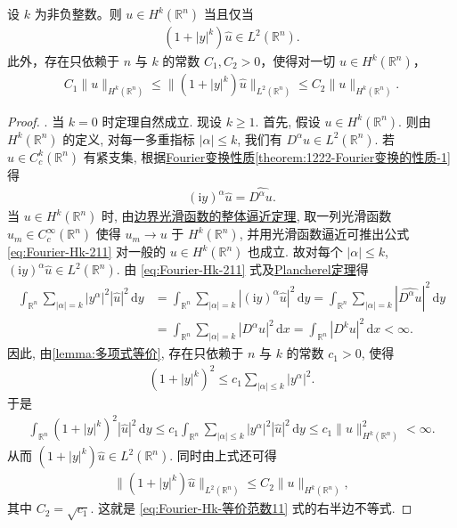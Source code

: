 \documentclass[../../main.tex]{subfiles}
\begin{document}
\begin{theorem}[用Fourier变换刻画 $H^k$]\label{theorem:Fourier刻画Hk-严谨}
设 $k$ 为非负整数。则 $u\in H^k(\mathbb{R}^n)$ 当且仅当
\begin{align*}
(1+|y|^k)\hat{u}\in L^2(\mathbb{R}^n).
\end{align*}
此外，存在只依赖于 $n$ 与 $k$ 的常数 $C_1,C_2>0$，使得对一切 $u\in H^k(\mathbb{R}^n)$，
\begin{align}\label{eq:Fourier-Hk-等价范数11}
C_1\|u\|_{H^k(\mathbb{R}^n)}
\leqslant \|(1+|y|^k)\hat{u}\|_{L^2(\mathbb{R}^n)}
\leqslant C_2\|u\|_{H^k(\mathbb{R}^n)}.
\end{align}
\end{theorem}
\begin{proof}

{. } 当 $k=0$ 时定理自然成立. 现设 $k\geqslant 1$. 首先, 假设 $u\in H^k(\mathbb{R}^n)$. 则由 $H^k(\mathbb{R}^n)$ 的定义, 对每一多重指标 $|\alpha|\leqslant k$, 我们有 $D^\alpha u\in L^2(\mathbb{R}^n)$. 若 $u\in C_c^k(\mathbb{R}^n)$ 有紧支集, 根据\hyperref[theorem:1222-Fourier变换的性质]{Fourier变换性质\ref{theorem:1222-Fourier变换的性质-1}}得
\begin{align}\label{eq:Fourier-Hk-211}
(\text{i}y)^\alpha\hat{u}=\widehat{D^\alpha u}.
\end{align}
当 $u\in H^k(\mathbb{R}^n)$ 时, 由\hyperref[theorem:ch05-直到边界光滑的函数整体逼近定理]{边界光滑函数的整体逼近定理}, 取一列光滑函数 $u_m\in C_c^\infty(\mathbb{R}^n)$ 使得 $u_m\to u$ 于 $H^k(\mathbb{R}^n)$, 并用光滑函数逼近可推出公式 \eqref{eq:Fourier-Hk-211} 对一般的 $u\in H^k(\mathbb{R}^n)$ 也成立. 故对每个 $|\alpha|\leqslant k$, $(\text{i}y)^\alpha\hat{u}\in L^2(\mathbb{R}^n)$. 由 \eqref{eq:Fourier-Hk-211} 式及\hyperref[theorem:Plancherel定理]{Plancherel定理}得
\begin{align*}
\int_{\mathbb{R}^n}\sum_{|\alpha|=k}|y^\alpha|^2|\hat{u}|^2\,\mathrm{d}y
&=\int_{\mathbb{R}^n}\sum_{|\alpha|=k}|(\text{i}y)^\alpha\hat{u}|^2\,\mathrm{d}y
=\int_{\mathbb{R}^n}\sum_{|\alpha|=k}|\widehat{D^\alpha u}|^2\,\mathrm{d}y \\
&=\int_{\mathbb{R}^n}\sum_{|\alpha|=k}|D^\alpha u|^2\,\mathrm{d}x
=\int_{\mathbb{R}^n}|D^k u|^2\,\mathrm{d}x<\infty.
\end{align*}
因此, 由\cref{lemma:多项式等价}, 存在只依赖于 $n$ 与 $k$ 的常数 $c_1>0$, 使得
\begin{align*}
(1+|y|^k)^2\leqslant c_1\sum_{|\alpha|\leqslant k}|y^\alpha|^2.
\end{align*}
于是
\begin{align*}
\int_{\mathbb{R}^n}(1+|y|^k)^2|\hat{u}|^2\,\mathrm{d}y
\leqslant c_1\int_{\mathbb{R}^n}\sum_{|\alpha|\leqslant k}|y^\alpha|^2|\hat{u}|^2\,\mathrm{d}y
\leqslant c_1\|u\|_{H^k(\mathbb{R}^n)}^2<\infty.
\end{align*}
从而 $(1+|y|^k)\hat{u}\in L^2(\mathbb{R}^n)$. 同时由上式还可得
\begin{align*}
\|(1+|y|^k)\hat{u}\|_{L^2(\mathbb{R}^n)}\leqslant C_2\|u\|_{H^k(\mathbb{R}^n)},
\end{align*}
其中 $C_2=\sqrt{c_1}$. 这就是 \eqref{eq:Fourier-Hk-等价范数11} 式的右半边不等式.


\end{proof}
\end{document}
